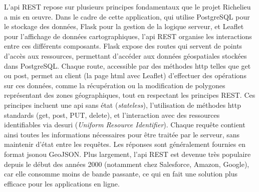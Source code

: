 L'\acrshort{api} REST repose sur plusieurs principes fondamentaux que le projet Richelieu a mis en œuvre. Dans le cadre de cette application, qui utilise PostgreSQL pour le stockage des données, Flask pour la gestion de la logique serveur, et Leaflet pour l'affichage de données cartographiques, l'\acrshort{api} REST organise les interactions entre ces différents composants. Flask expose des routes qui servent de points d'accès aux ressources, permettant d'accéder aux données géospatiales stockées dans PostgreSQL. Chaque route, accessible par des méthodes \acrshort{http} telles que \acrshort{get} ou \acrshort{post}, permet au client (la page \acrshort{html} avec Leaflet) d'effectuer des opérations sur ces données, comme la récupération ou la modification de polygones représentant des zones géographiques, tout en respectant les principes REST. Ces principes incluent une \acrshort{api} sans état  (\textit{stateless}), l'utilisation de méthodes \acrshort{http} standards (\acrshort{get}, \acrshort{post}, PUT, \acrshort{delete}), et l'interaction avec des ressources identifiables via des\acrshort{uri} (\textit{Uniform Resource Identifier}). Chaque requête contient ainsi toutes les informations nécessaires pour être traitée par le serveur, sans maintenir d'état entre les requêtes. Les réponses sont généralement fournies en format \acrshort{json}ou GeoJSON. Plus largement, l'\acrshort{api} REST est devenue très populaire depuis le début des années 2000 (notamment chez Salesforce, Amazon, Google), car elle consomme moins de bande passante, ce qui en fait une solution plus efficace pour les applications en ligne.

